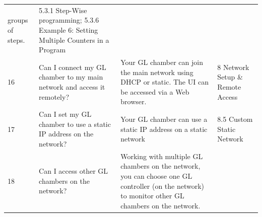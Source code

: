 \begin{longtable}[]{@{}llll@{}}
\begin{minipage}[t]{0.33\columnwidth}
groups of steps.\strut
\end{minipage} & \begin{minipage}[t]{0.17\columnwidth}\raggedright
5.3.1 Step-Wise programming; 5.3.6 Example 6: Setting Multiple Counters
in a Program\strut
\end{minipage}\tabularnewline
\begin{minipage}[t]{0.08\columnwidth}\raggedright
16\strut
\end{minipage} & \begin{minipage}[t]{0.30\columnwidth}\raggedright
Can I connect my GL chamber to my main network and access it
remotely?\strut
\end{minipage} & \begin{minipage}[t]{0.33\columnwidth}\raggedright
Your GL chamber can join the main network using DHCP or static. The UI
can be accessed via a Web browser.\strut
\end{minipage} & \begin{minipage}[t]{0.17\columnwidth}\raggedright
8 Network Setup \& Remote Access\strut
\end{minipage}\tabularnewline
\begin{minipage}[t]{0.08\columnwidth}\raggedright
17\strut
\end{minipage} & \begin{minipage}[t]{0.30\columnwidth}\raggedright
Can I set my GL chamber to use a static IP address on the network?\strut
\end{minipage} & \begin{minipage}[t]{0.33\columnwidth}\raggedright
Your GL chamber can use a static IP address on a static network\strut
\end{minipage} & \begin{minipage}[t]{0.17\columnwidth}\raggedright
8.5 Custom Static Network\strut
\end{minipage}\tabularnewline
\begin{minipage}[t]{0.08\columnwidth}\raggedright
18\strut
\end{minipage} & \begin{minipage}[t]{0.30\columnwidth}\raggedright
Can I access other GL chambers on the network?\strut
\end{minipage} & \begin{minipage}[t]{0.33\columnwidth}\raggedright
Working with multiple GL chambers on the network, you can choose one GL
controller (on the network) to monitor other GL chambers on the
network.\strut
\end{minipage} & \begin{minipage}[t]{0.17\columnwidth}\raggedright

\end{minipage}
\end{longtable}
